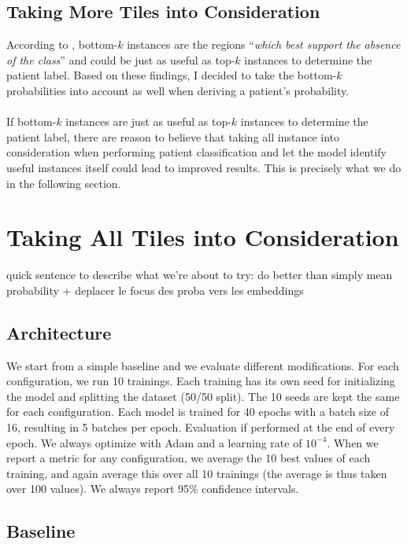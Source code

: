 \documentclass[final]{cvpr}
\begin{document}
	\subsection{Taking More Tiles into Consideration}
	
	According to \cite{owkin}, bottom-$k$ instances are the regions “\textit{which best support the absence of the class}” and could be just as useful as top-$k$ instances to determine the patient label. Based on these findings, I decided to take the bottom-$k$ probabilities into account as well when deriving a patient's probability.\\
	\\
	If bottom-$k$ instances are just as useful as top-$k$ instances to determine the patient label, there are reason to believe that taking all instance into consideration when performing patient classification and let the model identify useful instances itself could lead to improved results. This is precisely what we do in the following section.
	
	\section{Taking All Tiles into Consideration}
	
	quick sentence to describe what we're about to try: do better than simply mean probability + deplacer le focus des proba vers les embeddings
	
	\subsection{Architecture}
	
	We start from a simple baseline and we evaluate different modifications.
	For each configuration, we run 10 trainings. Each training has its own seed for initializing the model and splitting the dataset (50/50 split). The 10 seeds are kept the same for each configuration. Each model is trained for 40 epochs with a batch size of 16, resulting in 5 batches per epoch. Evaluation if performed at the end of every epoch. We always optimize with Adam and a learning rate of $10^{-4}$. When we report a metric for any configuration, we average the 10 best values of each training, and again average this over all 10 trainings (the average is thus taken over 100 values). We always report 95\% confidence intervals.
	
	\subsection{Baseline}
	
\end{document}
